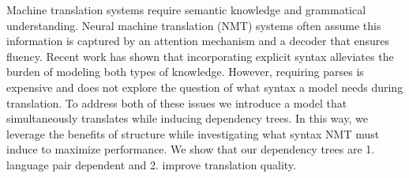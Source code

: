 Machine translation systems require semantic knowledge and grammatical understanding.  Neural machine translation (NMT) systems often assume this information is captured by an attention mechanism and a decoder that ensures fluency.  Recent work has shown that incorporating explicit syntax alleviates the burden of modeling both types of knowledge.  However, requiring parses is expensive and does not explore the question of what syntax a model needs during translation.  To address both of these issues we introduce a model that simultaneously translates while inducing dependency trees.  In this way, we leverage the benefits of structure while investigating what syntax NMT must induce to maximize performance.  We show that our dependency trees are 1. language pair dependent and 2. improve translation quality.
